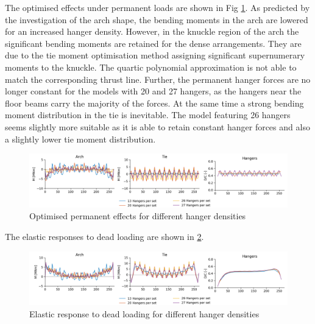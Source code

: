 The optimised effects under permanent loads are shown in Fig \ref{fig:hd_permanent}. As predicted by the investigation of the arch shape, the bending moments in the arch are lowered for an increased hanger density. However, in the knuckle region of the arch the significant bending moments are retained for the dense arrangements. They are due to the tie moment optimisation method assigning significant supernumerary moments to the knuckle. The quartic polynomial approximation is not able to match the corresponding thrust line. Further, the permanent hanger forces are no longer constant for the models with 20 and 27 hangers, as the hangers near the floor beams carry the majority of the forces. At the same time a strong bending moment distribution in the tie is inevitable. The model featuring 26 hangers seems slightly more suitable as it is able to retain constant hanger forces and also a slightly lower tie moment distribution.

\begin{figure}[H]
    \centering
    \includegraphics[trim={0 0 2cm 0},clip, width=\textwidth]{calculations/hanger density/permanent_plot.png}
    \caption{Optimised permanent effects for different hanger densities}
    \label{fig:hd_permanent}
\end{figure}

The elastic responses to dead loading are shown in \cref{fig:hd_elastic_response_dl}.

\begin{figure}[H]
    \centering
    \includegraphics[trim={0 0 2cm 0},clip, width=\textwidth]{calculations/hanger density/dead loading_plot.png}
    \caption{Elastic response to dead loading for different hanger densities}
    \label{fig:hd_elastic_response_dl}
\end{figure}

